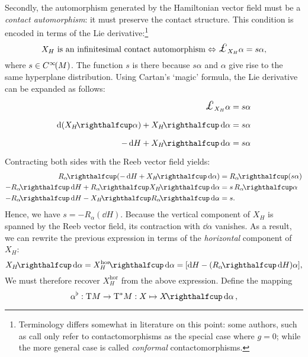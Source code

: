 Secondly, the automorphism generated by the Hamiltonian vector field must be a \emph{contact automorphism}: it must preserve the contact structure. This condition is encoded in terms of the Lie derivative:\footnote
{Terminology differs somewhat in literature on this point: some authors, such as \citet{DeLeon2020} call only refer to contactomorphisms as the special case where $g = 0$; while the more general case is called \emph{conformal} contactomorphisms.}
$$ X_H \text{ is an infinitesimal contact automorphism} \Leftrightarrow \lied{X_H}{\alpha} = s\alpha, $$
where $s \in C^\infty\!\qty(M)$. The function $s$ is there because $s \alpha $ and $\alpha$ give rise to the same hyperplane distribution. 
Using Cartan's `magic' formula, the Lie derivative can be expanded as follows:
\begin{equation*}
    \begin{split}
        \lied{X_H}{\alpha} &= s \alpha\\
        \dd{\qty(\intpr{X_H}{\alpha})} + \intpr{X_H}{\dd{\alpha}} &= s\alpha \\
        -\dd{H} + \intpr{X_H}{\dd{\alpha}} &= s\alpha \\
    \end{split}
\end{equation*}
Contracting both sides with the Reeb vector field yields:
\begin{equation*}
    \begin{split}
        \intpr{R_\alpha}{\qty(-\dd{H} + \intpr{X_H}{\dd{\alpha}})} &= \intpr{R_\alpha}{\qty(s\alpha)} \\
        -\intpr{R_\alpha}{\dd{H}} + \intpr{R_\alpha}{\intpr{X_H}{\dd{\alpha}}} &= s\,\intpr{R_\alpha}{\alpha} \\
        -\intpr{R_\alpha}{\dd{H}} - \intpr{X_H}{\intpr{R_\alpha}{\dd{\alpha}}} &= s.
    \end{split}
\end{equation*}
Hence, we have $s = -R_\alpha(\dd{H})$. Because the vertical component of $X_H$ is spanned by the Reeb vector field, its contraction with $\dd{\alpha}$ vanishes. As a result, we can rewrite the previous expression in terms of the \emph{horizontal} component of $X_H$:
\begin{equation}
    \intpr{X_H}{\dd{\alpha}} = \intpr{X_H^\text{hor}}{\dd{\alpha}}=  \qty[\dd{H} - \qty(\intpr{R_\alpha}{\dd{H}})\alpha], 
    \label{eq:basic_form}
\end{equation}
We must therefore recover $X^\text{hor}_H$ from the above expression. Define the mapping  
$$ \toDual{\alpha}: \tbundle{M} \to \ctbundle{M}: X \mapsto  \intpr{X}{\dd{\alpha}},$$
